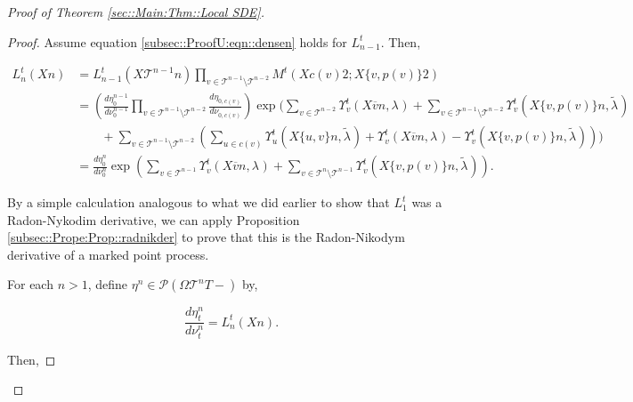 \documentclass[12pt]{article}
\newcommand{\mc}{\mathcal}
\newcommand{\ov}{\overline}
\newcommand{\ind}{\hspace{24pt}}
\newcommand{\pmsr}{\mc{P}}							%
\renewcommand{\v}{v}							%
\newcommand{\vv}{u}								%
\newcommand{\T}{T}								%
\renewcommand{\t}{t}							%
\newcommand{\X}{X}								%
\newcommand{\cl}{\ov}							%
\newcommand{\tree}{\mc{T}}						%
\newcommand{\sln}[1]{^{#1}}						%
\newcommand{\mm}[3]{\nu_{#2#1}^{#3}}						%
\newcommand{\mmm}[3]{\eta_{#2#1}^{#3}}						%
\newcommand{\rate}[1]{\lambda_{#1}}					%
\newcommand{\crate}[2]{\alt{\lambda}_{#1}^{#2}}		%
\newcommand{\alt}{\widetilde}						%
\newcommand{\dense}[2]{L_{#1}^{#2}}				%
\newcommand{\cdense}[2]{M_{#1}^{#2}}			%
\newcommand{\ds}[2]{\Upsilon_{#1}^{#2}}			%
\renewcommand{\c}[1]{c(#1)}						%
\newcommand{\p}[1]{p(#1)}						%
\begin{document}
\begin{proof}[Proof of Theorem \ref{sec::Main:Thm::Local SDE}]
\begin{proof}
Assume equation \eqref{subsec::ProofU:eqn::densen} holds for \(\dense{n-1}{\t}\). Then,

\begin{align*}
\dense{n}{\t}(\X{}{}{n}) &= \dense{n-1}{\t}(\X{\tree\sln{n-1}}{}{n})\prod_{\v\in\tree\sln{n-1}\setminus\tree\sln{n-2}} \cdense{}{\t}(\X{\c{\v}}{}{2};\X{\{\v,\p{\v}\}}{}{2})\\
&=\left(\frac{d\mmm{}{0}{n-1}}{d\mm{}{0}{n-1}}\prod_{\v\in\tree\sln{n-1}\setminus\tree\sln{n-2}}\frac{d\mmm{\c{\v}}{0,}{}}{d\mm{\c{\v}}{0,}{}}\right)\exp\Bigg(\sum_{\v\in\tree\sln{n-2}}\ds{\v}{\t}(\X{\cl{\v}}{}{n},\rate{}) + \sum_{\v\in\tree\sln{n-1}\setminus\tree\sln{n-2}} \ds{\v}{\t}(\X{\{\v,\p{\v}\}}{}{n},\crate{}{})\\
&\ind + \sum_{\v\in\tree\sln{n-1}\setminus\tree\sln{n-2}}\left(\sum_{\vv\in \c{\v}} \ds{\vv}{\t}(\X{\{\vv,\v\}}{}{n},\crate{}{}) + \ds{\v}{\t}(\X{\cl{\v}}{}{n},\rate{}) - \ds{\v}{\t}(\X{\{\v,\p{\v}\}}{}{n},\crate{}{})\right)\Bigg)\\
&=\frac{d\mmm{}{0}{n}}{d\mm{}{0}{n}}\exp\left(\sum_{\v\in\tree\sln{n-1}}\ds{\v}{\t}(\X{\cl{\v}}{}{n},\rate{}) + \sum_{\v\in\tree\sln{n}\setminus\tree\sln{n-1}} \ds{\v}{\t}(\X{\{\v,\p{\v}\}}{}{n},\crate{}{})\right).
\end{align*}

By a simple calculation analogous to what we did earlier to show that \(\dense{1}{\t}\) was a Radon-Nykodim derivative, we can apply Proposition \ref{subsec::Prope:Prop::radnikder} to prove that this is the Radon-Nikodym derivative of a marked point process. 

\ind For each \(n > 1\), define \(\mmm{}{}{n} \in \pmsr(\Omega{\tree\sln{n}}{\T-})\) by,

\[\frac{d\mmm{}{\t}{n}}{d\mm{}{\t}{n}} = \dense{n}{\t}(\X{}{}{n}).\]

Then,


\end{proof}
\end{proof}
\end{document}
